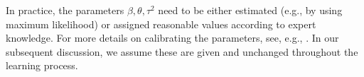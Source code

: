 \documentclass{wscpaperproc}
\theoremstyle{wsc}
\begin{document}
In practice, the parameters $\beta, \theta, \tau^2$ need to be either estimated (e.g., by using maximum likelihood) or assigned reasonable values according to expert knowledge. For more details on calibrating the parameters, see, e.g., . In our subsequent discussion, we assume these are given and unchanged throughout the learning process. 





\end{document}
